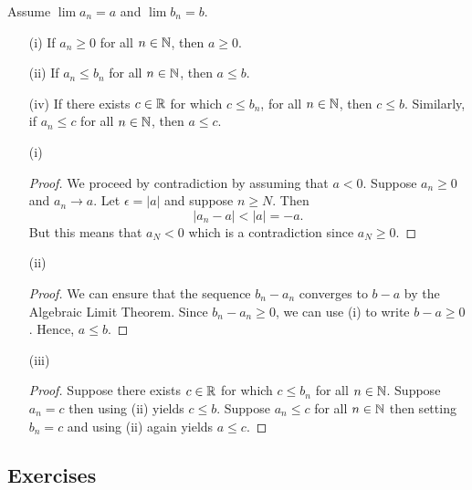 \begin{tcolorbox}
    \begin{thm} 
    Assume \( \lim a_n  = a\) and \( \lim b_n =  b\).
    \begin{enumerate}
        \item[(i)] If \( a_n \geq 0 \) for all \( n \in \mathbb{N} \), then \( a \geq 0\).
        \item[(ii)] If \( a_n \leq b_n\) for all \( n \in \mathbb{N} \), then \( a \leq b \).
        \item[(iv)] If there exists \( c \in \mathbb{R} \) for which \( c \leq b_n\), for all \( n \in \mathbb{N} \), then 
        \( c \leq b \). Similarly, if \( a_n \leq c \) for all \( n \in \mathbb{N} \), then \( a \leq c\).
    \end{enumerate}
    \end{thm}
\end{tcolorbox}

\begin{enumerate}


    \item[(i)] \begin{proof}
We proceed by contradiction by assuming that \( a < 0 \). Suppose \( a_n \geq 0 \) and \( a_n \to a \). Let \( \epsilon  = | a |\) and suppose \( n \geq N \). Then
\[ | a_n - a | < | a | = -a.\]
But this means that \( a_N < 0\) which is a contradiction since \( a_N \geq 0\).
\end{proof}
    \item[(ii)]
        \begin{proof}
        We can ensure that the sequence \( b_n - a_n\) converges to \( b - a\) by the Algebraic Limit Theorem. Since \( b_n - a_n \geq 0\), we can use (i) to write \( b - a \geq 0\). Hence, \( a \leq b\).
        \end{proof}
    \item[(iii)]
        \begin{proof}
            Suppose there exists \( c \in \mathbb{R}  \) for which \( c \leq b_n\) for all \( n \in \mathbb{N} \). Suppose \( a_n  = c \) then using (ii) yields \( c \leq b\). Suppose \( a_n \leq c\) for all \( n \in \mathbb{N} \) then setting \( b_n = c \) and using (ii) again yields \( a \leq c\).
        \end{proof}
\end{enumerate}


\subsection{Exercises}



